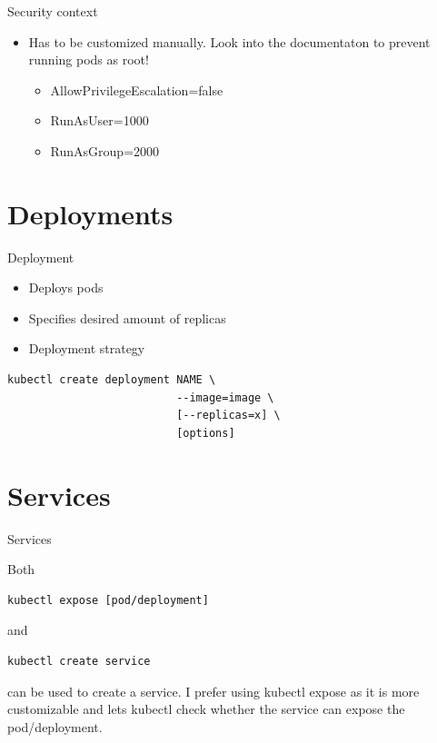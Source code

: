 \documentclass{beamer}
\begin{document}
\begin{frame}{Security context}
    \begin{itemize}
        \item Has to be customized manually. Look into the documentaton to prevent running pods as root!
        \begin{itemize}
            \item AllowPrivilegeEscalation=false
            \item RunAsUser=1000
            \item RunAsGroup=2000
        \end{itemize}
    \end{itemize}
\end{frame}

\section{Deployments}

\begin{frame}[fragile]{Deployment}

\begin{itemize}
    \item Deploys pods
    \item Specifies desired amount of replicas
    \item Deployment strategy
\end{itemize}

\begin{lstlisting}
kubectl create deployment NAME \ 
                          --image=image \
                          [--replicas=x] \ 
                          [options]
\end{lstlisting}

\end{frame}

\section{Services}

\begin{frame}[fragile]{Services}

Both
\begin{lstlisting}
kubectl expose [pod/deployment]
\end{lstlisting}
and 
\begin{lstlisting}
kubectl create service
\end{lstlisting}
can be used to create a service. 
\newline \newline
I prefer using kubectl expose as it is more customizable and lets kubectl check whether the service can expose the pod/deployment.

\end{frame}
\end{document}
